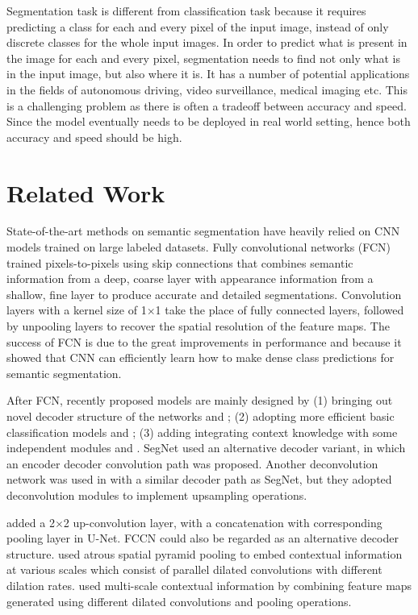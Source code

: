 \documentclass{article}
\begin{document}
Segmentation task is different from classification task because it requires predicting a class for each and every pixel of the input image, instead of only discrete classes for the whole input images. In order to predict what is present in the image for each and every pixel, segmentation needs to find not only what is in the input image, but also where it is. It has a number of potential applications in
the fields of autonomous driving, video surveillance, medical imaging etc. This is a challenging problem as there is often a tradeoff between accuracy and speed. Since the model eventually needs to be deployed in real world setting, hence both accuracy and speed should be high.

\section{Related Work}

State-of-the-art methods on semantic segmentation have heavily relied on CNN models trained on large labeled datasets. Fully convolutional networks (FCN) trained pixels-to-pixels using skip connections that combines semantic information from a deep, coarse layer with appearance information from a shallow, fine layer to produce accurate and detailed segmentations. Convolution layers with a kernel size of 1$\times$1 take the place of fully connected layers, followed by unpooling layers to recover the spatial resolution of the feature maps. The success of FCN is due to the great improvements in performance and because it showed that CNN can efficiently learn how to make dense class predictions for semantic segmentation.

After FCN, recently proposed models are mainly designed by (1) bringing out novel decoder structure of the networks \citep{girshick2014rich} and \citep{badrinarayanan2017segnet}; (2) adopting more efficient basic classification models \citep{liu2015semantic} and \citep{bittel2015pixel}; (3) adding integrating context knowledge with some independent modules \citep{zhu2015segdeepm} and \citep{ronneberger2015u}. SegNet \citep{badrinarayanan2017segnet} used an alternative decoder variant, in which an encoder decoder convolution path was proposed. Another deconvolution network was used in \citep{noh2015learning} with a similar decoder path as SegNet, but they adopted deconvolution modules to implement upsampling operations. 

\citep{ronneberger2015u} added a 2$\times$2 up-convolution layer, with a concatenation with corresponding pooling layer in U-Net. FCCN \citep{lin2016efficient} could also be regarded as an alternative decoder structure. \citep{chen2018encoder} used atrous spatial pyramid pooling to embed contextual information at various scales which consist of parallel dilated convolutions with different dilation rates. \citep{zhao2017pyramid} used multi-scale contextual information by combining feature maps generated using different dilated convolutions and pooling operations.
\end{document}
